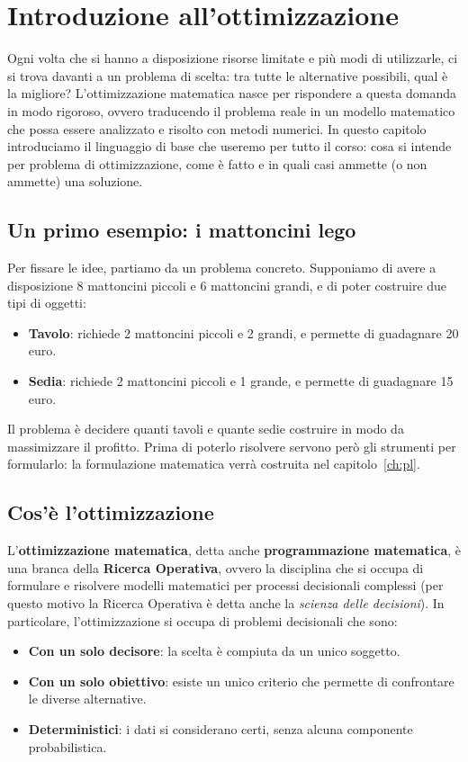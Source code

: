 \chapter{Introduzione all'ottimizzazione}
Ogni volta che si hanno a disposizione risorse limitate e più modi di utilizzarle, ci si trova davanti a un problema di scelta: tra tutte le alternative possibili, qual è la migliore? L'ottimizzazione matematica nasce per rispondere a questa domanda in modo rigoroso, ovvero traducendo il problema reale in un modello matematico che possa essere analizzato e risolto con metodi numerici. In questo capitolo introduciamo il linguaggio di base che useremo per tutto il corso: cosa si intende per problema di ottimizzazione, come è fatto e in quali casi ammette (o non ammette) una soluzione.

\section{Un primo esempio: i mattoncini lego}\label{sec:lego-intro}
Per fissare le idee, partiamo da un problema concreto. Supponiamo di avere a disposizione 8 mattoncini piccoli e 6 mattoncini grandi, e di poter costruire due tipi di oggetti:
\begin{itemize}
    \item \textbf{Tavolo}: richiede 2 mattoncini piccoli e 2 grandi, e permette di guadagnare 20 euro.
    \item \textbf{Sedia}: richiede 2 mattoncini piccoli e 1 grande, e permette di guadagnare 15 euro.
\end{itemize}

Il problema è decidere quanti tavoli e quante sedie costruire in modo da massimizzare il profitto. Prima di poterlo risolvere servono però gli strumenti per formularlo: la formulazione matematica verrà costruita nel capitolo~\ref{ch:pl}.

\section{Cos'è l'ottimizzazione}\label{sec:cos-e}
L'\textbf{ottimizzazione matematica}, detta anche \textbf{programmazione matematica}, è una branca della \textbf{Ricerca Operativa}, ovvero la disciplina che si occupa di formulare e risolvere modelli matematici per processi decisionali complessi (per questo motivo la Ricerca Operativa è detta anche la \emph{scienza delle decisioni}). In particolare, l'ottimizzazione si occupa di problemi decisionali che sono:
\begin{itemize}
    \item \textbf{Con un solo decisore}: la scelta è compiuta da un unico soggetto.
    \item \textbf{Con un solo obiettivo}: esiste un unico criterio che permette di confrontare le diverse alternative.
    \item \textbf{Deterministici}: i dati si considerano certi, senza alcuna componente probabilistica.
\end{itemize}

